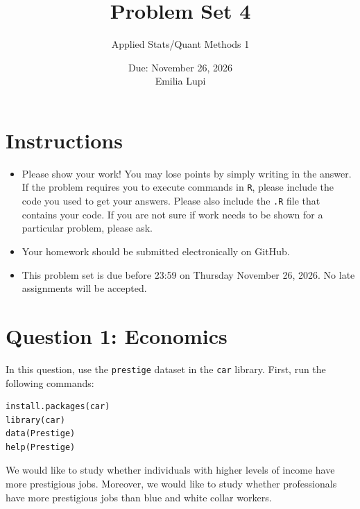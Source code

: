 \documentclass[12pt,letterpaper]{article}
\title{Problem Set 4}
\date{Due: November 26, 2026\\[0.5em]Emilia Lupi}
\author{Applied Stats/Quant Methods 1}
\begin{document}
	\maketitle
	\section*{Instructions}
	\begin{itemize}
		\item Please show your work! You may lose points by simply writing in the answer. If the problem requires you to execute commands in \texttt{R}, please include the code you used to get your answers. Please also include the \texttt{.R} file that contains your code. If you are not sure if work needs to be shown for a particular problem, please ask.
		\item Your homework should be submitted electronically on GitHub.
		\item This problem set is due before 23:59 on Thursday November 26, 2026. No late assignments will be accepted.
	\end{itemize}



	\vspace{.5cm}
\section*{Question 1: Economics}
\vspace{.25cm}
\noindent 	
In this question, use the \texttt{prestige} dataset in the \texttt{car} library. First, run the following commands:

\begin{verbatim}
install.packages(car)
library(car)
data(Prestige)
help(Prestige)
\end{verbatim} 


\noindent We would like to study whether individuals with higher levels of income have more prestigious jobs. Moreover, we would like to study whether professionals have more prestigious jobs than blue and white collar workers.
\end{document}
